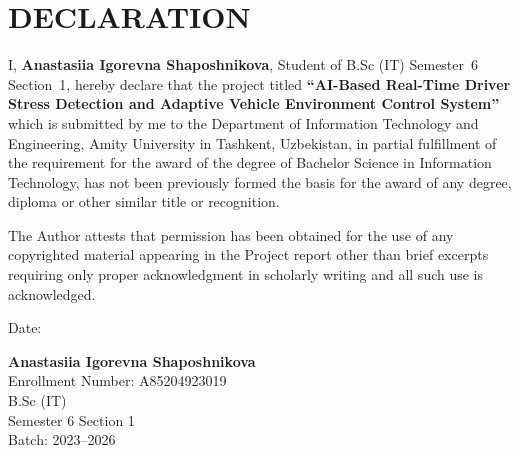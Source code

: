 \chapter*{DECLARATION}

I, \textbf{Anastasiia Igorevna Shaposhnikova}, Student of B.Sc (IT) Semester~6 Section~1,
hereby declare that the project titled \textbf{``AI-Based Real-Time Driver Stress Detection
and Adaptive Vehicle Environment Control System''} which is submitted by me to the Department
of Information Technology and Engineering, Amity University in Tashkent, Uzbekistan, in
partial fulfillment of the requirement for the award of the degree of Bachelor Science in
Information Technology, has not been previously formed the basis for the award of any degree,
diploma or other similar title or recognition.

The Author attests that permission has been obtained for the use of any copyrighted material
appearing in the Project report other than brief excerpts requiring only proper acknowledgment
in scholarly writing and all such use is acknowledged.

\vspace{2cm}
\noindent Date: \underline{\hspace{4cm}}

\vspace{1cm}
\noindent\textbf{Anastasiia Igorevna Shaposhnikova}\\
Enrollment Number: A85204923019\\
B.Sc (IT)\\
Semester 6 Section 1\\
Batch: 2023--2026
